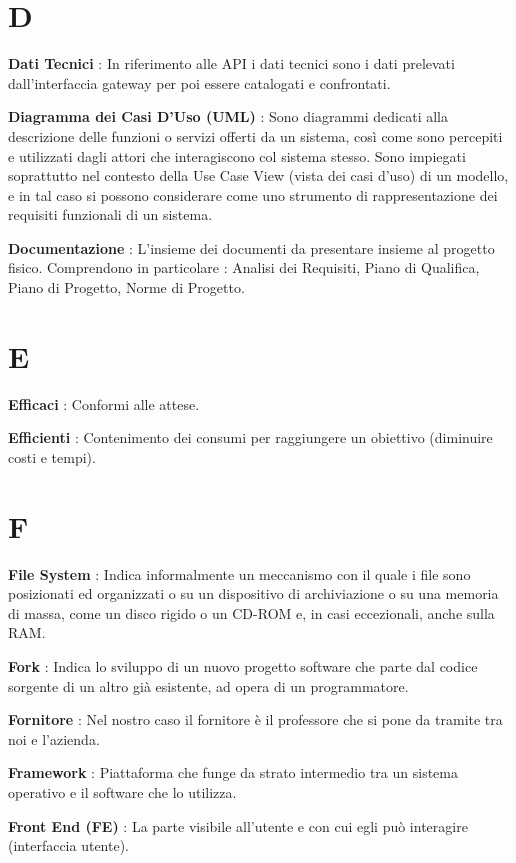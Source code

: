 \documentclass[12pt,a4paper,titlepage]{article}
\begin{document}
\section{D}
\begin{trivlist}
\item \textbf{Dati Tecnici} : In riferimento alle API i dati tecnici sono i dati prelevati dall'interfaccia gateway per poi essere catalogati e confrontati.
\item \textbf{Diagramma dei Casi D'Uso (UML)} : Sono diagrammi dedicati alla descrizione delle funzioni o servizi offerti da un sistema, così come sono percepiti e utilizzati dagli attori che interagiscono col sistema stesso. Sono impiegati soprattutto nel contesto della Use Case View (vista dei casi d'uso) di un modello, e in tal caso si possono considerare come uno strumento di rappresentazione dei requisiti funzionali di un sistema.
\item \textbf{Documentazione} : L'insieme dei documenti da presentare insieme al progetto fisico. Comprendono in particolare : Analisi dei Requisiti, Piano di Qualifica, Piano di Progetto, Norme di Progetto.
\end{trivlist}

\section{E}
\begin{trivlist}
\item \textbf{Efficaci} : Conformi alle attese.
\item \textbf{Efficienti} : Contenimento dei consumi per raggiungere un obiettivo (diminuire costi e tempi).
\end{trivlist}

\section{F}
\begin{trivlist}
\item \textbf{File System} : Indica informalmente un meccanismo con il quale i file sono posizionati ed organizzati o su un dispositivo di archiviazione o su una memoria di massa, come un disco rigido o un CD-ROM e, in casi eccezionali, anche sulla RAM.
\item \textbf{Fork} : Indica lo sviluppo di un nuovo progetto software che parte dal codice sorgente di un altro già esistente, ad opera di un programmatore.
\item \textbf{Fornitore} : Nel nostro caso il fornitore è il professore che si pone da tramite tra noi e l'azienda.
\item \textbf{Framework} : Piattaforma che funge da strato intermedio tra un sistema operativo e il software che lo utilizza.
\item \textbf{Front End (FE)} : La parte visibile all'utente e con cui egli può interagire (interfaccia utente).
\end{trivlist}
\end{document}
